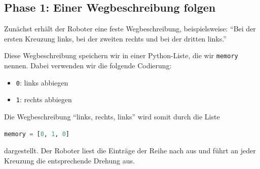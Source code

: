 \subsection{Phase 1: Einer Wegbeschreibung folgen}

Zunächst erhält der Roboter eine feste Wegbeschreibung,
beispielsweise: \enquote{Bei der ersten Kreuzung links,
    bei der zweiten rechts und bei der dritten links.}

Diese Wegbeschreibung speichern wir in einer Python-Liste,
die wir \texttt{memory} nennen. Dabei verwenden wir
die folgende Codierung:
\begin{itemize}
    \item \texttt{0}: links abbiegen
    \item \texttt{1}: rechts abbiegen
\end{itemize}

Die Wegbeschreibung \enquote{links, rechts, links} wird
somit durch die Liste

\begin{lstlisting}[language=Python]
memory = [0, 1, 0]
\end{lstlisting}

dargestellt. Der Roboter liest die Einträge der Reihe
nach aus und führt an jeder Kreuzung die entsprechende
Drehung aus.

